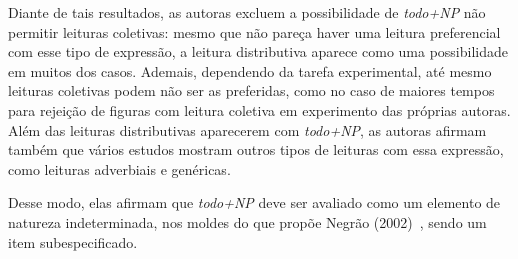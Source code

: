 Diante de tais resultados, as autoras excluem a possibilidade de \emph{todo+NP} não permitir leituras coletivas: mesmo que não pareça haver uma leitura preferencial com esse tipo de expressão, a leitura distributiva aparece como uma possibilidade em muitos dos casos. Ademais, dependendo da tarefa experimental, até mesmo leituras coletivas podem não ser as preferidas, como no caso de maiores tempos para rejeição de figuras com leitura coletiva em experimento das próprias autoras. Além das leituras distributivas aparecerem com \emph{todo+NP}, as autoras afirmam também que vários estudos mostram outros tipos de leituras com essa expressão, como leituras adverbiais e genéricas.

Desse modo, elas afirmam que \emph{todo+NP} deve ser avaliado como um elemento de natureza indeterminada, nos moldes do que propõe Negrão (2002)~\cite{neg2002}, sendo um item subespecificado.
